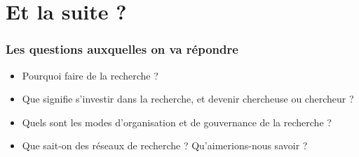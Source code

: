 \documentclass[xcolor=dvipsnames]{beamer}
\begin{document}
	\section{Et la suite ?}
	\begin{frame}
		\frametitle{Les questions auxquelles on va répondre}
		\begin{itemize}
			\item Pourquoi faire de la recherche ?
			\item Que signifie s'investir dans la recherche, et devenir chercheuse ou chercheur ?
			\item Quels sont les modes d'organisation et de gouvernance de la recherche ?
			\item Que sait-on des réseaux de recherche ? Qu'aimerions-nous savoir ?
		\end{itemize}
	\end{frame}
\end{document}
